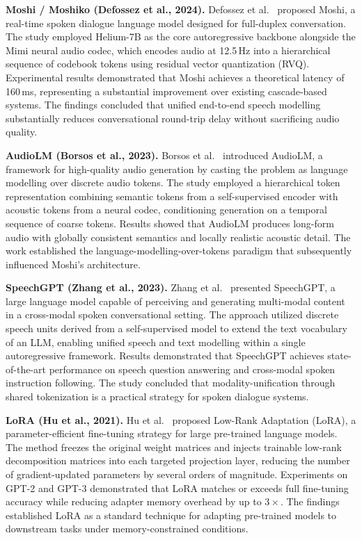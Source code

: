 \documentclass[conference]{IEEEtran}
\begin{document}
\textbf{Moshi / Moshiko (Defossez et al., 2024).}
Defossez et al.~\cite{defossez2024moshi} proposed Moshi, a real-time spoken
dialogue language model designed for full-duplex conversation.
The study employed Helium-7B as the core autoregressive backbone alongside the
Mimi neural audio codec, which encodes audio at 12.5\,Hz into a hierarchical
sequence of codebook tokens using residual vector quantization (RVQ).
Experimental results demonstrated that Moshi achieves a theoretical latency of
160\,ms, representing a substantial improvement over existing cascade-based
systems.
The findings concluded that unified end-to-end speech modelling substantially
reduces conversational round-trip delay without sacrificing audio quality.

\textbf{AudioLM (Borsos et al., 2023).}
Borsos et al.~\cite{borsos2023audiolm} introduced AudioLM, a framework for
high-quality audio generation by casting the problem as language modelling over
discrete audio tokens.
The study employed a hierarchical token representation combining semantic tokens
from a self-supervised encoder with acoustic tokens from a neural codec,
conditioning generation on a temporal sequence of coarse tokens.
Results showed that AudioLM produces long-form audio with globally consistent
semantics and locally realistic acoustic detail.
The work established the language-modelling-over-tokens paradigm that
subsequently influenced Moshi's architecture.

\textbf{SpeechGPT (Zhang et al., 2023).}
Zhang et al.~\cite{zhang2023speechgpt} presented SpeechGPT, a large language
model capable of perceiving and generating multi-modal content in a
cross-modal spoken conversational setting.
The approach utilized discrete speech units derived from a self-supervised model
to extend the text vocabulary of an LLM, enabling unified speech and text
modelling within a single autoregressive framework.
Results demonstrated that SpeechGPT achieves state-of-the-art performance on
speech question answering and cross-modal spoken instruction following.
The study concluded that modality-unification through shared tokenization is a
practical strategy for spoken dialogue systems.

\textbf{LoRA (Hu et al., 2021).}
Hu et al.~\cite{hu2021lora} proposed Low-Rank Adaptation (LoRA), a
parameter-efficient fine-tuning strategy for large pre-trained language models.
The method freezes the original weight matrices and injects trainable low-rank
decomposition matrices into each targeted projection layer, reducing the number
of gradient-updated parameters by several orders of magnitude.
Experiments on GPT-2 and GPT-3 demonstrated that LoRA matches or exceeds
full fine-tuning accuracy while reducing adapter memory overhead by up to $3\times$.
The findings established LoRA as a standard technique for adapting pre-trained
models to downstream tasks under memory-constrained conditions.
\end{document}
